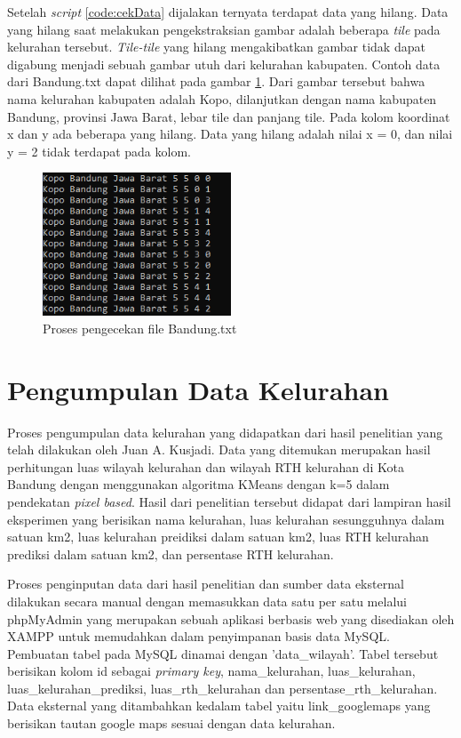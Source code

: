 Setelah \textit{script} \ref{code:cekData} dijalakan ternyata terdapat data yang hilang. Data yang hilang saat melakukan pengekstraksian gambar adalah beberapa \textit{tile} pada kelurahan tersebut. \textit{Tile-tile} yang hilang mengakibatkan gambar tidak dapat digabung menjadi sebuah gambar utuh dari kelurahan kabupaten. Contoh data dari Bandung.txt dapat dilihat pada gambar \ref{fig:kabupatenKopo}. Dari gambar tersebut bahwa nama kelurahan kabupaten adalah Kopo, dilanjutkan dengan nama kabupaten Bandung, provinsi Jawa Barat, lebar tile dan panjang tile. Pada kolom koordinat x dan y ada beberapa yang hilang. Data yang hilang adalah nilai x = 0, dan nilai y = 2 tidak terdapat pada kolom.
\begin{figure}[H]
	\centering
	\includegraphics[width=0.5\textwidth]{Gambar/kabupatenKopo.png}
	\caption{Proses pengecekan file Bandung.txt}
	\label{fig:kabupatenKopo}
\end{figure}


\section{Pengumpulan Data Kelurahan}
\label{sec:pengambilan-data-kelurahan}
Proses pengumpulan data kelurahan yang didapatkan dari hasil penelitian yang telah dilakukan oleh Juan A. Kusjadi. Data yang ditemukan merupakan hasil perhitungan luas wilayah kelurahan dan wilayah RTH kelurahan di Kota Bandung dengan menggunakan algoritma KMeans dengan k=5 dalam pendekatan \textit{pixel based}\cite{juan:22:pengumpulan}. Hasil dari penelitian tersebut didapat dari lampiran hasil eksperimen yang berisikan nama kelurahan, luas kelurahan sesungguhnya dalam satuan km2, luas kelurahan preidiksi dalam satuan km2, luas RTH kelurahan prediksi dalam satuan km2, dan persentase RTH kelurahan.

Proses penginputan data dari hasil penelitian dan sumber data eksternal dilakukan secara manual dengan memasukkan data satu per satu melalui phpMyAdmin yang merupakan sebuah aplikasi berbasis web yang disediakan oleh XAMPP  untuk memudahkan dalam penyimpanan basis data MySQL. Pembuatan tabel pada MySQL dinamai dengan 'data\_wilayah'. Tabel tersebut berisikan kolom id sebagai \textit{primary key}, nama\_kelurahan, luas\_kelurahan, luas\_kelurahan\_prediksi, luas\_rth\_kelurahan dan persentase\_rth\_kelurahan. Data eksternal yang ditambahkan kedalam tabel yaitu link\_googlemaps yang berisikan tautan google maps sesuai dengan data kelurahan. 

